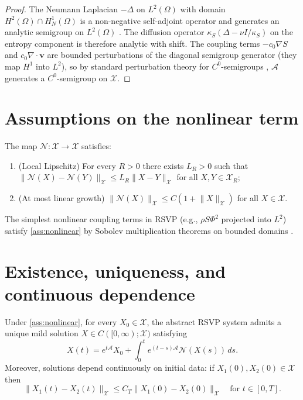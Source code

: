 \documentclass[12pt, oneside]{memoir}
\newcommand{\X}{\mathcal{X}}
\newcommand{\nnorm}[1]{\lVert #1 \rVert}
\newcommand{\bv}{\mathbf{v}}
\begin{document}
\begin{proof}
The Neumann Laplacian $-\Delta$ on $L^2(\Omega)$ with domain $H^2(\Omega) \cap
H^1_N(\Omega)$ is a non-negative self-adjoint operator and generates an analytic
semigroup on $L^2(\Omega)$ \cite{evans2010}.  The diffusion operator $\kappa_S(\Delta -
\nu I/\kappa_S)$ on the entropy component is therefore analytic with shift.  The
coupling terms $-c_0\nabla S$ and $c_0\nabla\cdot\bv$ are bounded perturbations of the
diagonal semigroup generator (they map $H^1$ into $L^2$), so by standard perturbation
theory for $C^0$-semigroups \cite{pazy1983}, $\mathcal{A}$ generates a $C^0$-semigroup
on $\X$.
\end{proof}

\section{Assumptions on the nonlinear term}

\begin{assumption}
\label{ass:nonlinear}
The map $\mathcal{N}: \X \to \X$ satisfies:
\begin{enumerate}
  \item (Local Lipschitz) For every $R > 0$ there exists $L_R > 0$ such that
        $\nnorm{\mathcal{N}(X) - \mathcal{N}(Y)}_\X \le L_R \nnorm{X-Y}_\X$
        for all $X, Y \in \X_R$;
  \item (At most linear growth) $\nnorm{\mathcal{N}(X)}_\X \le C(1 + \nnorm{X}_\X)$
        for all $X \in \X$.
\end{enumerate}
\end{assumption}

The simplest nonlinear coupling terms in RSVP (e.g., $\rho S \Phi^2$ projected into
$L^2$) satisfy \cref{ass:nonlinear} by Sobolev multiplication theorems on bounded
domains \cite{evans2010}.

\section{Existence, uniqueness, and continuous dependence}

\begin{theorem}
\label{thm:wellposed}
Under \cref{ass:nonlinear}, for every $X_0 \in \X$, the abstract RSVP system admits a
unique mild solution $X \in C([0,\infty); \X)$ satisfying
\[
  X(t) = e^{t\mathcal{A}} X_0 + \int_0^t e^{(t-s)\mathcal{A}} \mathcal{N}(X(s))\, ds.
\]
Moreover, solutions depend continuously on initial data: if $X_1(0), X_2(0) \in \X$
then
\[
  \nnorm{X_1(t) - X_2(t)}_\X \le C_T \nnorm{X_1(0) - X_2(0)}_\X
  \quad \text{for } t \in [0,T].
\]
\end{theorem}
\end{document}
